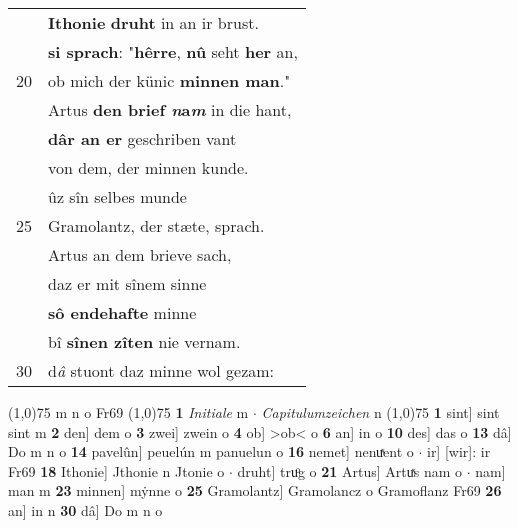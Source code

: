 \documentclass[8pt,a4paper,notitlepage]{article}
\begin{document}
\begin{table}[ht]
\begin{minipage}[t]{0.5\linewidth}
\begin{tabular}{rl}
 & \textbf{Ithonie} \textbf{druht} in an ir brust.\\ 
 & \textbf{si sprach}: "\textbf{hêrre}, \textbf{nû} seht \textbf{her} an,\\ 
20 & ob mich der künic \textbf{minnen man}."\\ 
 & Artus \textbf{den brief \textit{n}a\textit{m}} in die hant,\\ 
 & \textbf{dâr an er} geschriben vant\\ 
 & von dem, der minnen kunde.\\ 
 & ûz sîn selbes munde\\ 
25 & Gramolantz, der stæte, sprach.\\ 
 & Artus an dem brieve sach,\\ 
 & daz er mit sînem sinne\\ 
 & \textbf{sô endehafte} minne\\ 
 & bî \textbf{sînen zîten} nie vernam.\\ 
30 & d\textit{â} stuont daz minne wol gezam:\\ 
\end{tabular}
\scriptsize
\line(1,0){75} \newline
m n o Fr69 \newline
\line(1,0){75} \newline
\textbf{1} \textit{Initiale} m   $\cdot$ \textit{Capitulumzeichen} n  \newline
\line(1,0){75} \newline
\textbf{1} sint] sint sint m \textbf{2} den] dem o \textbf{3} zwei] zwein o \textbf{4} ob] >ob< o \textbf{6} an] in o \textbf{10} des] das o \textbf{13} dâ] Do m n o \textbf{14} pavelûn] peuelún m panuelun o \textbf{16} nemet] nenuͯent o  $\cdot$ ir] [wir]: ir Fr69 \textbf{18} Ithonie] Jthonie n Jtonie o  $\cdot$ druht] truͦg o \textbf{21} Artus] Artuͯs nam o  $\cdot$ nam] man m \textbf{23} minnen] mẏnne o \textbf{25} Gramolantz] Gramolancz o Gramoflanz Fr69 \textbf{26} an] in n \textbf{30} dâ] Do m n o \newline
\end{minipage}
\end{table}
\newpage
\end{document}
